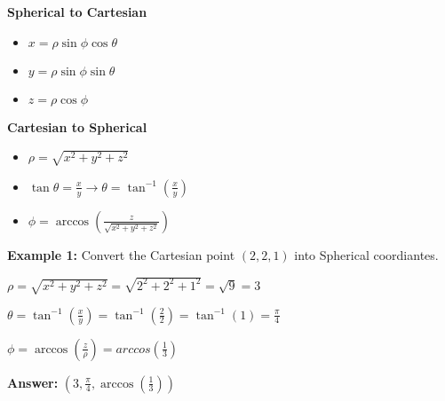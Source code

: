 \documentclass[10pt]{article}                               %
\begin{document}
\begin{adjustwidth}{2em}{0pt}
\begin{adjustwidth}{2em}{0pt}
\begin{notebox}
        \end{notebox}

        \vspace{0.5em}

        \textbf{Spherical to Cartesian}

            \begin{itemize}
                \item \( x = \rho\sin\phi\cos\theta \)
                \item \( y = \rho\sin\phi\sin\theta \)
                \item \( z = \rho\cos\phi \)
            \end{itemize}

            \vspace{0.5em}

            \textbf{Cartesian to Spherical}

            \begin{itemize}
                \item \( \rho = \sqrt{x^2 + y^2 + z^2} \)
                \item \( \tan\theta = \frac{x}{y}  \rightarrow  \theta = \tan^{-1}\left(\frac{x}{y}\right) \)
                \item \( \phi = \arccos\left(\frac{z}{\sqrt{x^2 + y^2 + z^2}}\right) \)
            \end{itemize}

            \begin{examplebox}
        
                \textbf{Example 1:} Convert the Cartesian point \( \left(2,2,1\right) \) into Spherical coordiantes.
                \vspace{0.5em}

                \begin{adjustwidth}{2em}{0pt}

                    \( \rho = \sqrt{x^2 + y^2 + z^2} = \sqrt{2^2 + 2^2 + 1^2} = \sqrt{9} = 3 \)

                    \( \theta = \tan^{-1}\left(\frac{x}{y}\right) = \tan^{-1}\left(\frac{2}{2}\right) = \tan^{-1}(1) = \frac{\pi}{4} \)

                    \( \phi = \arccos\left(\frac{z}{\rho}\right) = arccos\left(\frac{1}{3}\right) \)

                    \textbf{Answer:} \( \left(3, \frac{\pi}{4}, \arccos\left(\frac{1}{3}\right)\right) \)

                \end{adjustwidth}


\end{examplebox}
\end{adjustwidth}
\end{adjustwidth}
\end{document}
